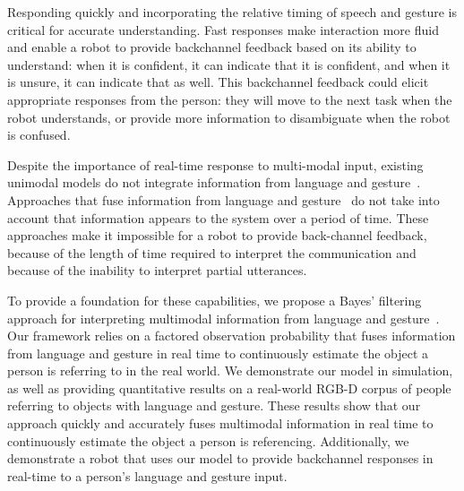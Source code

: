 \documentclass[graybox]{svmult}
\begin{document}
Responding quickly and incorporating the relative timing of speech and
gesture is critical for accurate understanding.  Fast responses make
interaction more fluid and enable a robot to provide backchannel
feedback based on its ability to understand: when it is confident, it
can indicate that it is confident, and when it is unsure, it can
indicate that as well.  This backchannel feedback could elicit
appropriate responses from the person: they will move to the next task
when the robot understands, or provide more information to
disambiguate when the robot is confused.


Despite the importance of real-time response to multi-modal input,
existing unimodal models do not integrate information from language
and gesture~\citep{matuszek14, tellex11, kollar10}.  Approaches that
fuse information from language and gesture~\citep{matuszek14} do not
take into account that information appears to the system over a period
of time.  These approaches make it impossible for a robot to provide
back-channel feedback, because of the length of time required to
interpret the communication and because of the inability to interpret
partial utterances.


To provide a foundation for these capabilities, we propose a Bayes'
filtering approach for interpreting multimodal information from
language and gesture~\citep{thrun08}.  Our framework relies on a
factored observation probability that fuses information from language
and gesture in real time to continuously estimate the object a person
is referring to in the real world.  We demonstrate our model in
simulation, as well as providing quantitative results on a real-world
RGB-D corpus of people referring to objects with language and gesture.
These results show that our approach quickly and accurately fuses
multimodal information in real time to continuously estimate the
object a person is referencing.  Additionally, we demonstrate a robot
that uses our model to provide backchannel responses in real-time to a
person's language and gesture input.
\end{document}
